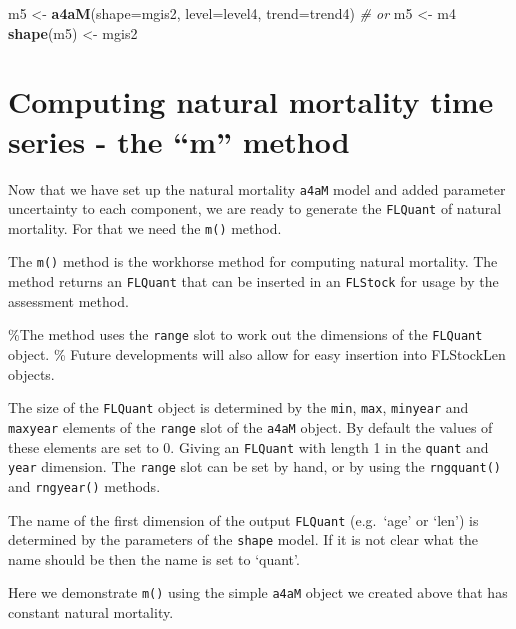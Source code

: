 \documentclass[
]{book}
\newenvironment{Shaded}{\begin{snugshade}}{\end{snugshade}}
\newcommand{\AttributeTok}[1]{\textcolor[rgb]{0.13,0.29,0.53}{#1}}
\newcommand{\CommentTok}[1]{\textcolor[rgb]{0.56,0.35,0.01}{\textit{#1}}}
\newcommand{\FunctionTok}[1]{\textcolor[rgb]{0.13,0.29,0.53}{\textbf{#1}}}
\newcommand{\NormalTok}[1]{#1}
\newcommand{\OtherTok}[1]{\textcolor[rgb]{0.56,0.35,0.01}{#1}}
\begin{document}
\begin{Shaded}
\begin{Highlighting}[]
\NormalTok{m5 }\OtherTok{\textless{}{-}} \FunctionTok{a4aM}\NormalTok{(}\AttributeTok{shape=}\NormalTok{mgis2, }\AttributeTok{level=}\NormalTok{level4, }\AttributeTok{trend=}\NormalTok{trend4)}
\CommentTok{\# or}
\NormalTok{m5 }\OtherTok{\textless{}{-}}\NormalTok{ m4}
\FunctionTok{shape}\NormalTok{(m5) }\OtherTok{\textless{}{-}}\NormalTok{ mgis2}
\end{Highlighting}
\end{Shaded}

\hypertarget{computing-natural-mortality-time-series---the-m-method}{%
\section{Computing natural mortality time series - the ``m'' method}\label{computing-natural-mortality-time-series---the-m-method}}

Now that we have set up the natural mortality \texttt{a4aM} model and added parameter uncertainty to each component, we are ready to generate the \texttt{FLQuant} of natural mortality. For that we need the \texttt{m()} method.

The \texttt{m()} method is the workhorse method for computing natural mortality. The method returns an \texttt{FLQuant} that can be inserted in an \texttt{FLStock} for usage by the assessment method.

\%The method uses the \texttt{range} slot to work out the dimensions of the \texttt{FLQuant} object.
\% Future developments will also allow for easy insertion into FLStockLen objects.

The size of the \texttt{FLQuant} object is determined by the \texttt{min}, \texttt{max}, \texttt{minyear} and \texttt{maxyear} elements of the \texttt{range} slot of the \texttt{a4aM} object. By default the values of these elements are set to 0. Giving an \texttt{FLQuant} with length 1 in the \texttt{quant} and \texttt{year} dimension. The \texttt{range} slot can be set by hand, or by using the \texttt{rngquant()} and \texttt{rngyear()} methods.

The name of the first dimension of the output \texttt{FLQuant} (e.g.~`age' or `len') is determined by the parameters of the \texttt{shape} model. If it is not clear what the name should be then the name is set to `quant'.

Here we demonstrate \texttt{m()} using the simple \texttt{a4aM} object we created above that has constant natural mortality.
\end{document}
